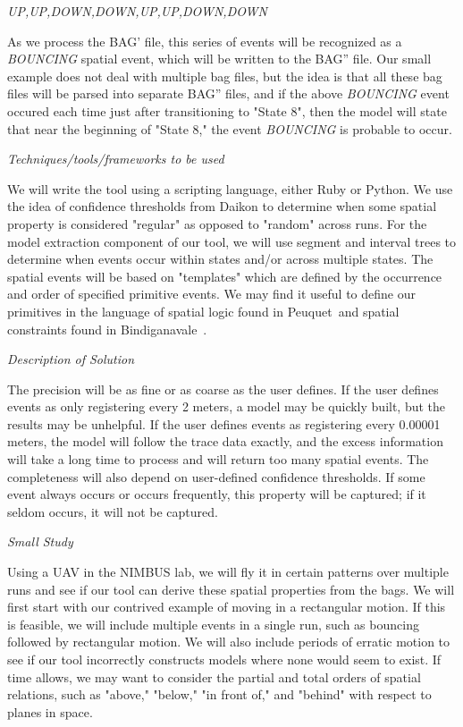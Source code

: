 \emph{UP,UP,DOWN,DOWN,UP,UP,DOWN,DOWN}

As we process the BAG' file, this series of events will be recognized as a \emph{BOUNCING} spatial event, which will be written to the BAG'' file.  
Our small example does not deal with multiple bag files, but the idea is that all these bag files will be parsed into separate BAG'' files, and if the above \emph{BOUNCING} event occured each time just after transitioning to "State 8", then the model will state that near the beginning of "State 8," the event \emph{BOUNCING} is probable to occur.

\emph{Techniques/tools/frameworks to be used}

We will write the tool using a scripting language, either Ruby or Python.
We use the idea of confidence thresholds from Daikon to determine when some spatial property is considered "regular" as opposed to "random" across runs. 
For the model extraction component of our tool, we will use segment and interval trees to determine when events occur within states and/or across multiple states.
The spatial events will be based on "templates" which are defined by the occurrence and order of specified primitive events.
We may find it useful to define our primitives in the language of spatial logic found in Peuquet~\etal and spatial constraints found in Bindiganavale~\etal. 

\emph{Description of Solution}

The precision will be as fine or as coarse as the user defines.
If the user defines events as only registering every 2 meters, a model may be quickly built, but the results may be unhelpful.
If the user defines events as registering every 0.00001 meters, the model will follow the trace data exactly, and the excess information will take a long time to process and will return too many spatial events.
The completeness will also depend on user-defined confidence thresholds.
If some event always occurs or occurs frequently, this property will be captured; if it seldom occurs, it will not be captured.  

\emph{Small Study}

Using a UAV in the NIMBUS lab, we will fly it in certain patterns over multiple runs and see if our tool can derive these spatial properties from the bags.
We will first start with our contrived example of moving in a rectangular motion.  
If this is feasible, we will include multiple events in a single run, such as bouncing followed by rectangular motion.
We will also include periods of erratic motion to see if our tool incorrectly constructs models where none would seem to exist.
If time allows, we may want to consider the partial and total orders of spatial relations, such as "above," "below," "in front of," and "behind" with respect to planes in space.

